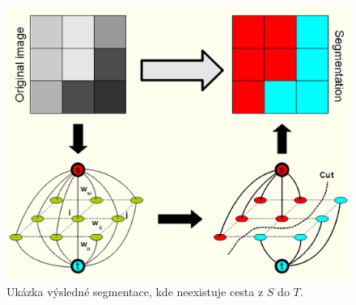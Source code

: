 \documentclass[12pt, a4paper]{article}
\begin{document}
\begin{figure}[ht!]
	\centering
	\includegraphics[width=\textwidth]{graph.png}
	\caption{Ukázka výsledné segmentace, kde neexistuje cesta z $S$ do $T$.}
\end{figure}
\end{document}
